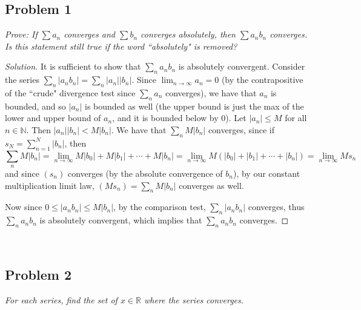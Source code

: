 \documentclass{article}
\newcommand{\N}{{\mathbb N}}
\newcommand{\R}{{\mathbb R}}
\begin{document}
\subsection*{Problem 1}
{\it Prove: If $\sum a_n$ converges and $\sum b_n$ converges absolutely,
then $\sum a_nb_n$ converges.
Is this statement still true if the word ``absolutely" is removed?}

\begin{proof}[Solution]\let\qed\relax
	It is sufficient to show that $\sum_n a_nb_n$ is absolutely convergent.
	Consider the series $\sum_n|a_nb_n| = \sum_n|a_n||b_n|$.
	Since $\lim_{n\to\infty} a_n = 0$
	(by the contrapositive of the ``crude" divergence test since $\sum_n a_n$ converges),
	we have that $a_n$ is bounded,
	and so $|a_n|$ is bounded as well
	(the upper bound is just the max of the lower and upper bound of $a_n$,
	and it is bounded below by $0$).
	Let $|a_n| \leq M$ for all $n \in \N$.
	Then $|a_n||b_n| < M|b_n|$.
	We have that $\sum_n M|b_n|$ converges,
	since if $s_N = \sum_{n=1}^N |b_n|$, then
	\[
		\sum_n M|b_n| = \lim_{n\to\infty} M|b_0| + M|b_1| + \cdots + M|b_n|
		= \lim_{n\to\infty} M(|b_0| + |b_1| + \cdots + |b_n|)
		= \lim_{n\to\infty} Ms_n
	\]
	and since $(s_n)$ converges (by the absolute convergence of $b_n$),
	by our constant multiplication limit law, $(Ms_n) = \sum_nM|b_n|$
	converges as well.

	Now since $0 \leq |a_nb_n| \leq M|b_n|$,
	by the comparison test, $\sum_n |a_nb_n|$ converges,
	thus $\sum_n a_nb_n$ is absolutely convergent,
	which implies that $\sum_n a_nb_n$ converges.
\end{proof}
\clearpage
~\clearpage

\subsection*{Problem 2}
{\it For each series, find the set of $x \in \R$ where the series converges.}
\end{document}
